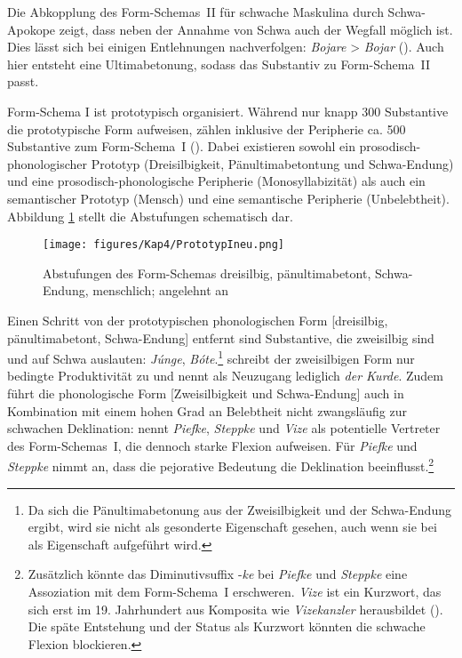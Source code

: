Die Abkopplung des Form-Schemas~II für schwache Maskulina durch Schwa-Apokope zeigt, dass neben der Annahme von Schwa auch der Wegfall möglich ist. Dies lässt sich bei einigen Entlehnungen nachverfolgen: \textit{Bojare} > \textit{Bojar} (\cite[168]{Kopcke.1995}). Auch hier entsteht eine Ultimabetonung, sodass das Substantiv zu Form-Schema~II passt.

Form-Schema I ist prototypisch organisiert. Während nur knapp 300 Substantive die prototypische Form aufweisen, zählen inklusive der Peripherie ca. 500 Substantive zum Form-Schema~I (\cite[98--99]{Bittner.20031991}). Dabei existieren sowohl ein prosodisch-phonologischer Prototyp (Dreisilbigkeit, Pänultimabetontung und \mbox{Schwa-En}\-dung) und eine prosodisch-phonologische Peripherie (Monosyllabizität) als auch ein semantischer Prototyp (Mensch) und eine semantische Peripherie (Unbelebtheit). Abbildung \ref{fig2lnm} stellt die Abstufungen schematisch dar.

\begin{figure}
\texttt{[image: figures/Kap4/PrototypIneu.png]}  
\caption{Abstufungen des Form-Schemas dreisilbig, pänultimabetont, Schwa-Endung, menschlich; angelehnt an \textcite[170]{Kopcke.1995}}
\label{fig2lnm}
\end{figure}

Einen Schritt von der prototypischen phonologischen Form [dreisilbig, pänultimabetont, Schwa-Endung] entfernt sind Substantive, die zweisilbig sind und auf Schwa auslauten: \textit{Júnge}, \textit{Bóte}.\footnote{Da sich die Pänultimabetonung aus der Zweisilbigkeit und der Schwa-Endung ergibt, wird sie nicht als gesonderte Eigenschaft gesehen, auch wenn sie bei \textcite[113]{Kopcke.2000} als Eigenschaft aufgeführt wird.} \textcite[171]{Kopcke.1995} schreibt der zweisilbigen Form nur bedingte Produktivität zu und nennt als Neuzugang lediglich \textit{der Kurde}. Zudem führt die phonologische Form [Zweisilbigkeit und Schwa-Endung] auch in Kombination mit einem hohen Grad an Belebtheit nicht zwangsläufig zur schwachen Deklination: \textcite[172]{Kopcke.1995} nennt \textit{Piefke}, \textit{Steppke} und \textit{Vize} als potentielle Vertreter des Form-Schemas~I, die dennoch starke Flexion aufweisen. Für \textit{Piefke} und \textit{Steppke} nimmt \textcite[172]{Kopcke.1995} an, dass die pejorative Bedeutung die Deklination beeinflusst.\footnote{Zusätzlich könnte das Diminutivsuffix -\textit{ke} bei \textit{Piefke} und \textit{Steppke} eine Assoziation mit dem Form-Schema~I erschweren. \textit{Vize} ist ein Kurzwort, das sich erst im 19. Jahrhundert aus Komposita wie \textit{Vizekanzler} herausbildet (\cite[1520]{Pfeifer.2000}). Die späte Entstehung und der Status als Kurzwort könnten die schwache Flexion blockieren.}  



